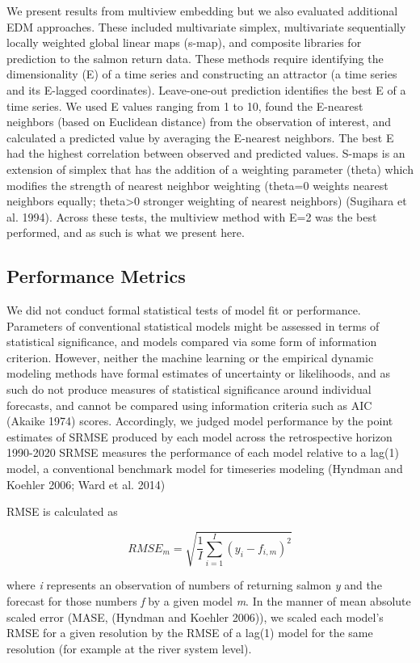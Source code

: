 \documentclass[
]{article}
\begin{document}
We present results from multiview embedding but we also evaluated additional EDM approaches. These included multivariate simplex, multivariate sequentially locally weighted global linear maps (s-map), and composite libraries for prediction to the salmon return data. These methods require identifying the dimensionality (E) of a time series and constructing an attractor (a time series and its E-lagged coordinates). Leave-one-out prediction identifies the best E of a time series. We used E values ranging from 1 to 10, found the E-nearest neighbors (based on Euclidean distance) from the observation of interest, and calculated a predicted value by averaging the E-nearest neighbors. The best E had the highest correlation between observed and predicted values. S-maps is an extension of simplex that has the addition of a weighting parameter (theta) which modifies the strength of nearest neighbor weighting (theta=0 weights nearest neighbors equally; theta\textgreater0 stronger weighting of nearest neighbors) (Sugihara et al. 1994). Across these tests, the multiview method with E=2 was the best performed, and as such is what we present here.

\hypertarget{performance-metrics}{%
\subsection{Performance Metrics}\label{performance-metrics}}

We did not conduct formal statistical tests of model fit or performance. Parameters of conventional statistical models might be assessed in terms of statistical significance, and models compared via some form of information criterion. However, neither the machine learning or the empirical dynamic modeling methods have formal estimates of uncertainty or likelihoods, and as such do not produce measures of statistical significance around individual forecasts, and cannot be compared using information criteria such as AIC (Akaike 1974) scores. Accordingly, we judged model performance by the point estimates of SRMSE produced by each model across the retrospective horizon 1990-2020 SRMSE measures the performance of each model relative to a lag(1) model, a conventional benchmark model for timeseries modeling (Hyndman and Koehler 2006; Ward et al. 2014)

RMSE is calculated as

\[RMSE_m = \sqrt{\frac{1}{I}\sum\limits_{i = 1}^I(y_{i} - f_{i,m})^2}\]

where \emph{i} represents an observation of numbers of returning salmon \emph{y} and the forecast for those numbers \emph{f} by a given model \emph{m}. In the manner of mean absolute scaled error (MASE, (Hyndman and Koehler 2006)), we scaled each model's RMSE for a given resolution by the RMSE of a lag(1) model for the same resolution (for example at the river system level).
\end{document}
